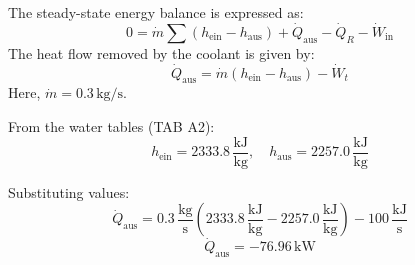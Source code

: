 The steady-state energy balance is expressed as:  
\[
0 = \dot{m} \sum \left( h_{\text{ein}} - h_{\text{aus}} \right) + \dot{Q}_{\text{aus}} - \dot{Q}_R - \dot{W}_{\text{in}}
\]  
The heat flow removed by the coolant is given by:  
\[
\dot{Q}_{\text{aus}} = \dot{m} \left( h_{\text{ein}} - h_{\text{aus}} \right) - \dot{W}_t
\]  
Here, \(\dot{m} = 0.3 \, \text{kg/s}\).  

From the water tables (TAB A2):  
\[
h_{\text{ein}} = 2333.8 \, \frac{\text{kJ}}{\text{kg}}, \quad h_{\text{aus}} = 2257.0 \, \frac{\text{kJ}}{\text{kg}}
\]  

Substituting values:  
\[
\dot{Q}_{\text{aus}} = 0.3 \, \frac{\text{kg}}{\text{s}} \left( 2333.8 \, \frac{\text{kJ}}{\text{kg}} - 2257.0 \, \frac{\text{kJ}}{\text{kg}} \right) - 100 \, \frac{\text{kJ}}{\text{s}}
\]  
\[
\dot{Q}_{\text{aus}} = -76.96 \, \text{kW}
\]